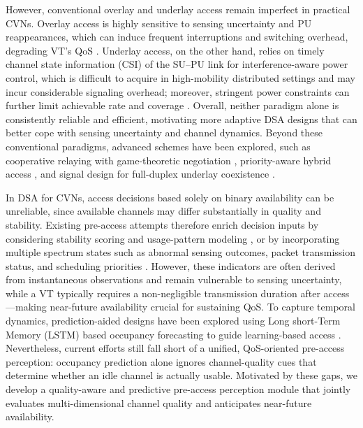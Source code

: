 \documentclass[journal]{IEEEtran}
\begin{document}
However, conventional overlay and underlay access remain imperfect in practical CVNs. Overlay access is highly sensitive to sensing uncertainty and PU reappearances, which can induce frequent interruptions and switching overhead, degrading VT's QoS \cite{ref10}. Underlay access, on the other hand, relies on timely channel state information (CSI) of the SU--PU link for interference-aware power control, which is difficult to acquire in high-mobility distributed settings and may incur considerable signaling overhead; moreover, stringent power constraints can further limit achievable rate and coverage \cite{ref11}. Overall, neither paradigm alone is consistently reliable and efficient, motivating more adaptive DSA designs that can better cope with sensing uncertainty and channel dynamics. Beyond these conventional paradigms, advanced schemes have been explored, such as cooperative relaying with game-theoretic negotiation \cite{ref12}, priority-aware hybrid access \cite{ref13}, and signal design for full-duplex underlay coexistence \cite{ref14}.\par
In DSA for CVNs, access decisions based solely on binary availability can be unreliable, since available channels may differ substantially in quality and stability. Existing pre-access attempts therefore enrich decision inputs by considering stability scoring and usage-pattern modeling \cite{ref15, ref16}, or by incorporating multiple spectrum states such as abnormal sensing outcomes, packet transmission status, and scheduling priorities \cite{ref17}. However, these indicators are often derived from instantaneous observations and remain vulnerable to sensing uncertainty, while a VT typically requires a non-negligible transmission duration after access—making near-future availability crucial for sustaining QoS. To capture temporal dynamics, prediction-aided designs have been explored using Long short-Term Memory (LSTM) based occupancy forecasting to guide learning-based access \cite{ref18}. Nevertheless, current efforts still fall short of a unified, QoS-oriented pre-access perception: occupancy prediction alone ignores channel-quality cues that determine whether an idle channel is actually usable. Motivated by these gaps, we develop a quality-aware and predictive pre-access perception module that jointly evaluates multi-dimensional channel quality and anticipates near-future availability.\par
\end{document}
